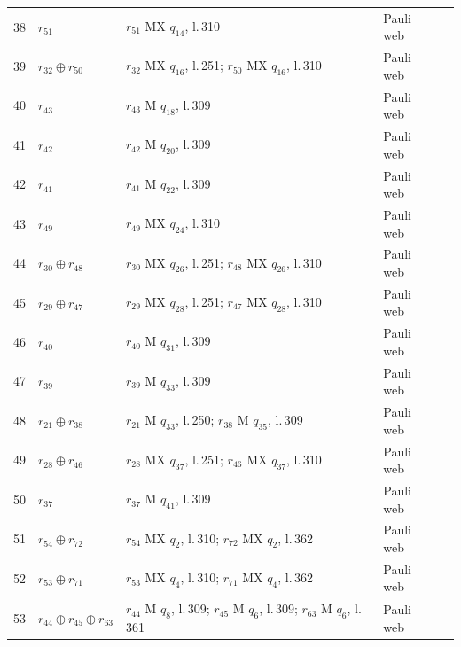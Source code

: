 \documentclass[11pt]{article}
\begin{document}
\begin{semiwebaddition}
{\begin{longtable}{rp{.3\linewidth}p{.43\linewidth}lr}
38 & $r_{51}$ & $r_{51}$ MX $q_{14}$, l.\,310 & Pauli web & \hyperref[d5_det038]{\pageref*{d5_det038}}\\
39 & $r_{32}\oplus r_{50}$ & $r_{32}$ MX $q_{16}$, l.\,251; $r_{50}$ MX $q_{16}$, l.\,310 & Pauli web & \hyperref[d5_det039]{\pageref*{d5_det039}}\\
40 & $r_{43}$ & $r_{43}$ M $q_{18}$, l.\,309 & Pauli web & \hyperref[d5_det040]{\pageref*{d5_det040}}\\
41 & $r_{42}$ & $r_{42}$ M $q_{20}$, l.\,309 & Pauli web & \hyperref[d5_det041]{\pageref*{d5_det041}}\\
42 & $r_{41}$ & $r_{41}$ M $q_{22}$, l.\,309 & Pauli web & \hyperref[d5_det042]{\pageref*{d5_det042}}\\
43 & $r_{49}$ & $r_{49}$ MX $q_{24}$, l.\,310 & Pauli web & \hyperref[d5_det043]{\pageref*{d5_det043}}\\
44 & $r_{30}\oplus r_{48}$ & $r_{30}$ MX $q_{26}$, l.\,251; $r_{48}$ MX $q_{26}$, l.\,310 & Pauli web & \hyperref[d5_det044]{\pageref*{d5_det044}}\\
45 & $r_{29}\oplus r_{47}$ & $r_{29}$ MX $q_{28}$, l.\,251; $r_{47}$ MX $q_{28}$, l.\,310 & Pauli web & \hyperref[d5_det045]{\pageref*{d5_det045}}\\
46 & $r_{40}$ & $r_{40}$ M $q_{31}$, l.\,309 & Pauli web & \hyperref[d5_det046]{\pageref*{d5_det046}}\\
47 & $r_{39}$ & $r_{39}$ M $q_{33}$, l.\,309 & Pauli web & \hyperref[d5_det047]{\pageref*{d5_det047}}\\
48 & $r_{21}\oplus r_{38}$ & $r_{21}$ M $q_{33}$, l.\,250; $r_{38}$ M $q_{35}$, l.\,309 & Pauli web & \hyperref[d5_det048]{\pageref*{d5_det048}}\\
49 & $r_{28}\oplus r_{46}$ & $r_{28}$ MX $q_{37}$, l.\,251; $r_{46}$ MX $q_{37}$, l.\,310 & Pauli web & \hyperref[d5_det049]{\pageref*{d5_det049}}\\
50 & $r_{37}$ & $r_{37}$ M $q_{41}$, l.\,309 & Pauli web & \hyperref[d5_det050]{\pageref*{d5_det050}}\\
51 & $r_{54}\oplus r_{72}$ & $r_{54}$ MX $q_{2}$, l.\,310; $r_{72}$ MX $q_{2}$, l.\,362 & Pauli web & \hyperref[d5_det051]{\pageref*{d5_det051}}\\
52 & $r_{53}\oplus r_{71}$ & $r_{53}$ MX $q_{4}$, l.\,310; $r_{71}$ MX $q_{4}$, l.\,362 & Pauli web & \hyperref[d5_det052]{\pageref*{d5_det052}}\\
53 & $r_{44}\oplus r_{45}\oplus r_{63}$ & $r_{44}$ M $q_{8}$, l.\,309; $r_{45}$ M $q_{6}$, l.\,309; $r_{63}$ M $q_{6}$, l.\,361 & Pauli web & \hyperref[d5_det053]{\pageref*{d5_det053}}\\

\end{longtable}}
\end{semiwebaddition}
\end{document}
